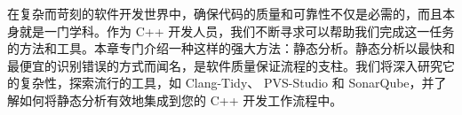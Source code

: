 在复杂而苛刻的软件开发世界中，确保代码的质量和可靠性不仅是必需的，而且本身就是一门学科。作为 C++ 开发人员，我们不断寻求可以帮助我们完成这一任务的方法和工具。本章专门介绍一种这样的强大方法：静态分析。静态分析以最快和最便宜的识别错误的方式而闻名，是软件质量保证流程的支柱。我们将深入研究它的复杂性，探索流行的工具，如 Clang-Tidy、 PVS-Studio 和 SonarQube，并了解如何将静态分析有效地集成到您的 C++ 开发工作流程中。